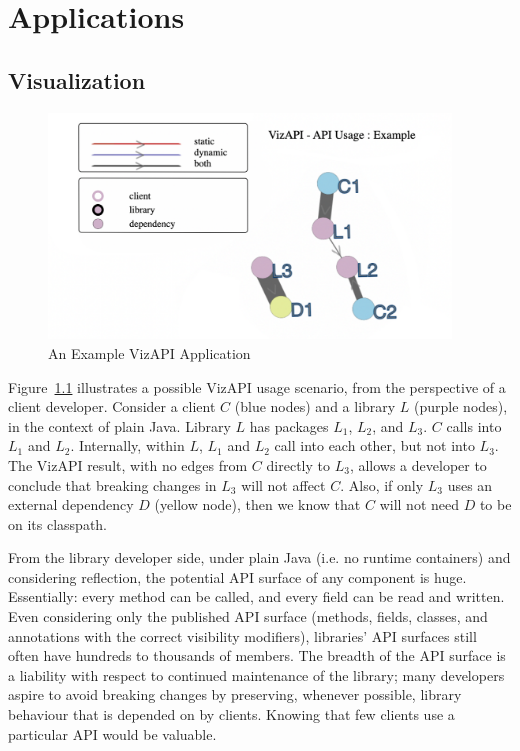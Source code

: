 \chapter{Applications}
\section{Visualization}
\begin{figure}[h]
\begin{center}
\includegraphics[height=6cm]{images/intro-example.png}
\caption{An Example VizAPI Application}
\label{fig:example}
\end{center}
\end{figure}


Figure~\ref{fig:example} illustrates a possible VizAPI usage scenario, from the perspective of a client developer. Consider a client $C$ (blue nodes) and a library $L$ (purple nodes), in the context of plain Java. Library $L$ has packages $L_1$, $L_2$, and $L_3$. $C$ calls into $L_1$ and $L_2$. Internally, within $L$, $L_1$ and $L_2$ call into each other, but not into $L_3$. The VizAPI result, with no edges from $C$ directly to $L_3$, allows a developer to conclude that breaking changes in $L_3$ will not affect $C$. Also, if only $L_3$ uses an external dependency $D$ (yellow node), then we know that $C$ will not need $D$ to be on its classpath.

From the library developer side, under plain Java (i.e. no runtime containers) and considering reflection, the potential API surface of any component is huge. Essentially: every method can be called, and every field can be read and written. Even considering only the published API surface (methods, fields, classes, and annotations with the correct visibility modifiers), libraries' API surfaces still often have hundreds to thousands of members. The breadth of the API surface is a liability with respect to continued maintenance of the library; many developers aspire to avoid breaking changes by preserving, whenever possible, library behaviour that is depended on by clients. Knowing that few clients use a particular API would be valuable.

